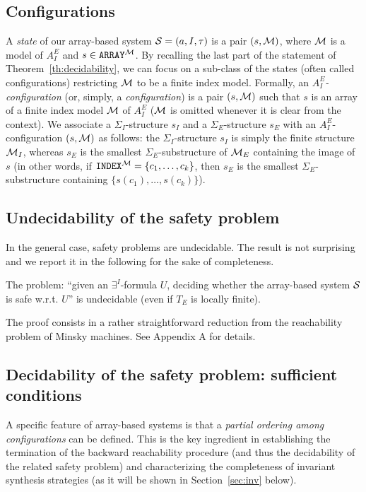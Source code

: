 \documentclass{LMCS}
\newcommand{\cM}{\ensuremath \mathcal M}
\newcommand{\cSi}{\ensuremath \mathcal S}
\theoremstyle{plain}\newtheorem{assumption}[thm]{Assumption}
\theoremstyle{plain}\newtheorem{proposition}[thm]{Proposition}
\theoremstyle{plain}\newtheorem{property}[thm]{Property}
\theoremstyle{plain}\newtheorem{example}[thm]{Example}
\theoremstyle{plain}\newtheorem{claim}[thm]{Claim}
\theoremstyle{plain}\newtheorem{lemma}[thm]{Lemma}
\begin{document}
\subsection{Configurations}
\label{subsec:configurations}
A \emph{state} of our array-based system $\cSi=(a,I,\tau)$ is a pair
$(s, \cM)$, where $\cM$ is a model of $A_I^E$ and
$s\in\texttt{ARRAY}^{\cM}$.  By recalling the last part of the
statement of Theorem~\ref{th:decidability}, we can focus on a
sub-class of the states (often called configurations) restricting
$\cM$ to be a finite index model.  Formally, an
\emph{$A_I^E$-configuration} (or, simply, a \emph{configuration}) is a
pair $(s, \cM)$ such that $s$ is an array of a finite index model
$\cM$ of $A_I^E$ ($\cM$ is omitted whenever it is clear from the
context).  We associate a $\Sigma_I$-structure $s_I$ and a
$\Sigma_E$-structure $s_E$ with an $A_I^E$-configuration $(s, \cM)$ as
follows: the $\Sigma_I$-structure $s_I$ is simply the finite structure
$\cM_I$, whereas $s_E$ is the smallest $\Sigma_E$-substructure of
$\cM_E$ containing the image of $s$ (in other words, if ${\tt
  INDEX}^{\cM}=\{c_1, \dots, c_k\}$, then $s_E$ is the smallest
$\Sigma_E$-substructure containing $\{s(c_1), \dots, s(c_k)\}$).


\subsection{Undecidability of the safety problem}
\label{subsec:undec}
In the general case, safety problems are undecidable. The result is
not surprising and we report it in the following for the sake of
completeness.
\begin{thm}
  \label{th:undecidability}
  The problem: ``given an $\exists^I$-formula $U$, deciding whether
  the array-based system $\cSi$ is safe w.r.t. $U$'' is undecidable
  (even if $T_E$ is locally finite).
\end{thm}
The proof consists in a rather straightforward reduction from the
reachability problem of Minsky machines.  See Appendix A for details.

\subsection{Decidability of the safety problem: sufficient conditions}
\label{subsec:dec}

A specific feature of array-based systems is that a \emph{partial
  ordering among configurations} can be defined.  This is the key
ingredient in establishing the termination of the backward
reachability procedure (and thus the decidability of the related
safety problem) and characterizing the completeness of invariant
synthesis strategies (as it will be shown in Section~\ref{sec:inv}
below).
\end{document}
